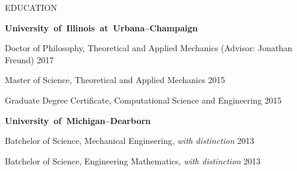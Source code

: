 \documentclass{resume} %
\newcommand{\seps}{2pt}
\newenvironment{innerlist}[1][\enskip\textbullet]%
        {\begin{itemize}[#1,leftmargin=*,parsep=0pt,itemsep=\seps,topsep=0pt,partopsep=0pt,leftmargin=28pt]}
        {\end{itemize}}
\newcommand\UIUC{\mbox{University of Illinois at Urbana--Champaign}}
\newcommand\UMD{\mbox{University of Michigan--Dearborn}}
\begin{document}
\begin{rSection}{{\Large E}DUCATION}

{\bf \UIUC}

\setlength\parindent{0pt}
\setlength\parskip{3pt}

\begin{adjustwidth}{14pt}{0pt}
    Doctor of Philosophy, Theoretical and Applied Mechanics (Advisor: Jonathan Freund) \hfill 2017 

	Master of Science, Theoretical and Applied Mechanics \hfill 2015
	
	Graduate Degree Certificate, Computational Science and Engineering \hfill 2015
\end{adjustwidth}

\vspace{0.15cm}
{\bf \UMD}
\begin{adjustwidth}{14pt}{0pt}
	Batchelor of Science, Mechanical Engineering, \textit{with distinction} \hfill 2013
	
	Batchelor of Science, Engineering Mathematics, \textit{with distinction} \hfill 2013
\end{adjustwidth}

\end{rSection}
\end{document}
